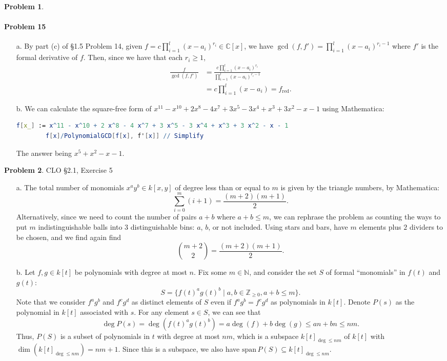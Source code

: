 \documentclass[12pt]{amsart}
\theoremstyle{definition}
\newtheorem{prob}{Problem}
\begin{document}
\begin{flushleft}
\begin{prob}
\paragraph{Problem 15} \begin{enumerate}
    \item[a.] By part (c) of \S1.5 Problem 14, given $f = c \prod_{i=1}^l (x-a_i)^{r_i} \in \mathbb C[x]$, we have $\gcd(f,f')=\prod_{i=1}^l (x-a_i)^{r_i-1}$ where $f'$ is the formal derivative of $f$. 
    Then, since we have that each $r_i \ge 1$,
    \begin{align*}
        \frac{f}{\gcd(f,f')} &= \frac{c\prod_{i=1}^l  (x-a_i)^{r_i}}{\prod_{i=1}^l (x-a_i)^{r_i-1}} \\
        &= c\prod_{i=1}^l (x-a_i) = f_\text{red}.
    \end{align*}
    \item[b.] 
    We can calculate the square-free form of $x^{11} - x^{10} + 2 x^8 - 4 x^7 + 3x^5 - 3x^4 + x^3 + 3x^2 -x - 1$ using Mathematica:
    \begin{lstlisting}[language=Mathematica]
        f[x_] := x^11 - x^10 + 2 x^8 - 4 x^7 + 3 x^5 - 3 x^4 + x^3 + 3 x^2 - x - 1
        f[x]/PolynomialGCD[f[x], f'[x]] // Simplify
    \end{lstlisting}
    The answer being $x^5+x^2-x-1$.
 \end{enumerate}
\end{prob}
\bigskip 

\begin{prob} CLO \S2.1, Exercise 5 \smallskip \\

\begin{enumerate}
    \item[a.]  The total number of monomials $x^ay^b \in k[x,y]$ of degree less than or equal to $m$ is given by the triangle numbers, by Mathematica:
    \[\sum_{i=0}^m (i+1) = \frac{(m+2)(m+1)}{2}.\]
    Alternatively, since we need to count the number of pairs $a+b$ where $a+b\le m$, we can rephrase the problem as counting the ways to put $m$ indistinguishable balls into $3$ distinguishable bins: $a$, $b$, or not included. Using stars and bars, have $m$ elements plus $2$ dividers to be chosen, and we find again find \[\binom{m+2}{2} = \frac{(m+2)(m+1)}{2}.\]
    \item[b.] Let $f,g\in k[t]$ be polynomials with degree at most $n$. Fix some $m \in \mathbb N$, and consider the set $S$ of formal ``monomials'' in $f(t)$ and $g(t)$: \[S=\{f(t)^ag(t)^b \mid a,b\in \mathbb Z_{\ge 0}, a+b\le m \}.\] 
    Note that we consider $f^ag^b$ and $f^cg^d$ as distinct elements of $S$ even if $f^ag^b = f^cg^d$ as polynomials in $k[t]$. Denote $P(s)$ as the polynomial in $k[t]$ associated with $s$. For any element $s \in S$, we can see that \[\deg P(s) = \deg (f(t)^a g(t)^b) = a\deg(f) + b\deg(g)\le a n+b n \le nm.\] Thus, $P(S)$ is a subset of polynomials in $t$ with degree at most $nm$, which is a subspace $k[t]_{\deg \le nm}$ of $k[t]$ with $\dim(k[t]_{\deg \le nm}) =nm+1$. Since this is a subspace, we also have $\text{span}\,P(S) \subseteq k[t]_{\deg\le nm}$.


\end{enumerate}
\end{prob}
\end{flushleft}
\end{document}
